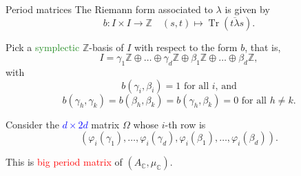 \documentclass[usenames,dvipsnames]{beamer}
\def\Z{\mathbb{Z}}
\def\C{\mathbb{C}}
\DeclareMathOperator{\Tr}{Tr}
\newcommand{\vphi}{\varphi}
\newcommand{\red}[1]{\textcolor{red}{#1}}
\newcommand{\blue}[1]{\textcolor{blue}{#1}}
\newcommand{\green}[1]{\textcolor{ForestGreen}{#1}}
\begin{document}
\begin{frame}{ Period matrices }
   The Riemann form associated to $\lambda$ is given by
   \[ b:I\times I \to \Z \quad (s,t)\mapsto \Tr(\overline{t\lambda}s). \]
    
   \pause Pick a \green{symplectic} $\Z$-basis of $I$ with respect to the form $b$, that is,
    \[ I = \gamma_1 \Z \oplus \ldots \oplus \gamma_d \Z \oplus \beta_1 \Z \oplus \ldots \oplus \beta_d \Z, \]
    \pause with
    \[ b(\gamma_i,\beta_i)=1 \text{ for all $i$, and}\]
    \[b(\gamma_h,\gamma_k)=b(\beta_h,\beta_k)=b(\gamma_h,\beta_k)=0 \text{ for all $h\neq k$}. \]
    
    \pause Consider the \blue{$d\times 2d$} matrix $\Omega$ whose $i$-th row is 
    \[(\vphi_i(\gamma_1),\ldots,\vphi_i(\gamma_d),\vphi_i(\beta_1),\ldots,\vphi_i(\beta_d)).\]
    
    \pause This is \red{big period matrix} of $(A_\C,\mu_\C)$.
\end{frame}
    
\end{document}
